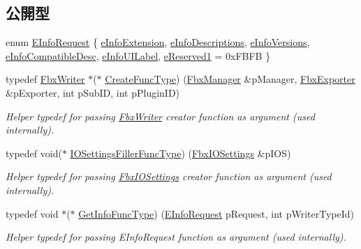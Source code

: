 \subsection*{公開型}
\begin{DoxyCompactItemize}
\item 
enum \hyperlink{class_fbx_writer_a250cda8a59afd8e6be01c89cdd914e2a}{E\+Info\+Request} \{ \newline
\hyperlink{class_fbx_writer_a250cda8a59afd8e6be01c89cdd914e2aa685ae092e9d1dd70ee474474e6709ef1}{e\+Info\+Extension}, 
\hyperlink{class_fbx_writer_a250cda8a59afd8e6be01c89cdd914e2aaa784d31d1a1b64f8806e2bf08a7357ad}{e\+Info\+Descriptions}, 
\hyperlink{class_fbx_writer_a250cda8a59afd8e6be01c89cdd914e2aa5f280243592cee085c8955019a55e3a0}{e\+Info\+Versions}, 
\hyperlink{class_fbx_writer_a250cda8a59afd8e6be01c89cdd914e2aa91a4948dc9ea8e95d12c6b11800b8b4c}{e\+Info\+Compatible\+Desc}, 
\newline
\hyperlink{class_fbx_writer_a250cda8a59afd8e6be01c89cdd914e2aad8a61c4aecfefa09584a0aa66a31b4ba}{e\+Info\+U\+I\+Label}, 
\hyperlink{class_fbx_writer_a250cda8a59afd8e6be01c89cdd914e2aadb4e4b68e6bb39c4f0ada4b3088ad4f7}{e\+Reserved1} = 0x\+F\+B\+FB
 \}
\item 
typedef \hyperlink{class_fbx_writer}{Fbx\+Writer} $\ast$($\ast$ \hyperlink{class_fbx_writer_aa634a7d29a01f8197f814437644e845b}{Create\+Func\+Type}) (\hyperlink{class_fbx_manager}{Fbx\+Manager} \&p\+Manager, \hyperlink{class_fbx_exporter}{Fbx\+Exporter} \&p\+Exporter, int p\+Sub\+ID, int p\+Plugin\+ID)
\begin{DoxyCompactList}\small\item\em Helper typedef for passing \hyperlink{class_fbx_writer}{Fbx\+Writer} creator function as argument (used internally). \end{DoxyCompactList}\item 
typedef void($\ast$ \hyperlink{class_fbx_writer_a43eb86f1aae1a6a424c54bcf294553c5}{I\+O\+Settings\+Filler\+Func\+Type}) (\hyperlink{class_fbx_i_o_settings}{Fbx\+I\+O\+Settings} \&p\+I\+OS)
\begin{DoxyCompactList}\small\item\em Helper typedef for passing \hyperlink{class_fbx_i_o_settings}{Fbx\+I\+O\+Settings} creator function as argument (used internally). \end{DoxyCompactList}\item 
typedef void $\ast$($\ast$ \hyperlink{class_fbx_writer_a6c13529045946d474e1e69fa0a6b9305}{Get\+Info\+Func\+Type}) (\hyperlink{class_fbx_writer_a250cda8a59afd8e6be01c89cdd914e2a}{E\+Info\+Request} p\+Request, int p\+Writer\+Type\+Id)
\begin{DoxyCompactList}\small\item\em Helper typedef for passing E\+Info\+Request function as argument (used internally). \end{DoxyCompactList}\end{DoxyCompactItemize}
